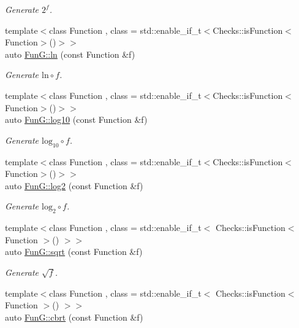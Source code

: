 \begin{DoxyCompactItemize}
\begin{DoxyCompactList}\small\item\em Generate $2^f$. \end{DoxyCompactList}\item 
{\footnotesize template$<$class Function , class  = std\-::enable\-\_\-if\-\_\-t$<$\-Checks\-::is\-Function$<$\-Function$>$()$>$$>$ }\\auto \hyperlink{group__CMathGroup_ga31313571b08f65b853643e14fc8fc714}{Fun\-G\-::ln} (const Function \&f)
\begin{DoxyCompactList}\small\item\em Generate $ \mathrm{ln}\circ f $. \end{DoxyCompactList}\item 
{\footnotesize template$<$class Function , class  = std\-::enable\-\_\-if\-\_\-t$<$\-Checks\-::is\-Function$<$\-Function$>$()$>$$>$ }\\auto \hyperlink{group__CMathGroup_gae9506f4e0e6fad4f756f636044697bfe}{Fun\-G\-::log10} (const Function \&f)
\begin{DoxyCompactList}\small\item\em Generate $ \mathrm{log}_{10}\circ f $. \end{DoxyCompactList}\item 
{\footnotesize template$<$class Function , class  = std\-::enable\-\_\-if\-\_\-t$<$\-Checks\-::is\-Function$<$\-Function$>$()$>$$>$ }\\auto \hyperlink{group__CMathGroup_gacd6be7e9de7bbd54c852f0acf0c7d2c2}{Fun\-G\-::log2} (const Function \&f)
\begin{DoxyCompactList}\small\item\em Generate $ \mathrm{log}_{2}\circ f $. \end{DoxyCompactList}\item 
{\footnotesize template$<$class Function , class  = std\-::enable\-\_\-if\-\_\-t$<$ Checks\-::is\-Function$<$ Function $>$() $>$$>$ }\\auto \hyperlink{group__CMathGroup_ga136c890475e48f88469a737d95368d05}{Fun\-G\-::sqrt} (const Function \&f)
\begin{DoxyCompactList}\small\item\em Generate $ \sqrt{f} $. \end{DoxyCompactList}\item 
{\footnotesize template$<$class Function , class  = std\-::enable\-\_\-if\-\_\-t$<$ Checks\-::is\-Function$<$ Function $>$() $>$$>$ }\\auto \hyperlink{group__CMathGroup_gaa7f2552adfb8ec41aeb685adddd8bf98}{Fun\-G\-::cbrt} (const Function \&f)

\end{DoxyCompactItemize}
